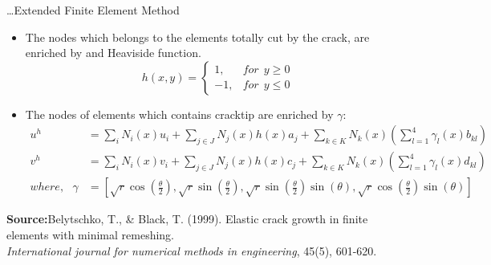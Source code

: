 \documentclass{beamer}
\begin{document}
\begin{frame}[t,fragile]{\ldots Extended Finite Element Method}
    \vspace{-.3cm}
     \footnotesize
    \begin{itemize}
        \item The nodes which belongs to the elements totally cut by the crack, are enriched by and Heaviside function.
    $$h(x,y)=\begin{cases}1,&       for ~ ~ y\ge 0\\ -1,&       for~ ~ y\le 0\end{cases}$$
\item The nodes of elements which contains cracktip are enriched by $\gamma$:
     \footnotesize
    \begin{align*}
    u^h&=\sum_i N_i(x)u_i+\sum_{j\in J} N_j(x) h(x)a_j+\sum_{k\in K} N_k(x)\left( \sum_{l=1}^{4}\gamma_l(x)b_{kl} \right) \\
    v^h&=\sum_i N_i(x)v_i+\sum_{j\in J} N_j(x) h(x)c_j+\sum_{k\in K} N_k(x)\left( \sum_{l=1}^{4}\gamma_l(x)d_{kl} \right) \\ 
    where,\ \ \ \gamma&=\left[ \sqrt{r}\cos \left( \frac{\theta}{2} \right), \sqrt{r}\sin\left( \frac{\theta}{2} \right),\sqrt{r}\sin\left( \frac{\theta}{2} \right)\sin(\theta),\sqrt{r}\cos\left( \frac{\theta}{2} \right)\sin(\theta)\right] 
\end{align*}
\end{itemize}
\tiny
\hspace{10pt}
\textbf{Source:}Belytschko, T., \& Black, T. (1999). Elastic crack growth in finite elements with minimal remeshing. \\
\vspace{-7pt}
\hspace{10pt}
\emph{International journal for numerical methods in engineering}, 45(5), 601-620.
\end{frame}
\end{document}
